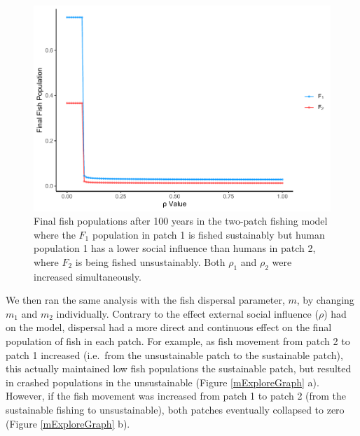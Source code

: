 \documentclass[
  12pt,
]{article}
\begin{document}
\begin{figure}
\centering
\includegraphics{Wulfing_Thesis_files/figure-latex/rhoExploreGraph-1.pdf}
\caption{\label{fig:rhoExploreGraph}Final fish populations after 100 years in the two-patch fishing model where the \(F_1\) population in patch 1 is fished sustainably but human population 1 has a lower social influence than humans in patch 2, where \(F_2\) is being fished unsustainably. Both \(\rho_1\) and \(\rho_2\) were increased simultaneously. \label{rhoExploreGraph}}
\end{figure}

We then ran the same analysis with the fish dispersal parameter, \(m\), by changing \(m_1\) and \(m_2\) individually. Contrary to the effect external social influence (\(\rho\)) had on the model, dispersal had a more direct and continuous effect on the final population of fish in each patch. For example, as fish movement from patch 2 to patch 1 increased (i.e.~from the unsustainable patch to the sustainable patch), this actually maintained low fish populations the sustainable patch, but resulted in crashed populations in the unsustainable (Figure \ref{mExploreGraph} a). However, if the fish movement was increased from patch 1 to patch 2 (from the sustainable fishing to unsustainable), both patches eventually collapsed to zero (Figure \ref{mExploreGraph} b).
\end{document}
